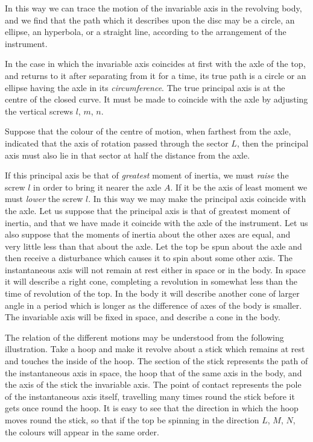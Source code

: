 \documentclass[12pt]{article}
\begin{document}
In this way we can trace the motion of the invariable axis in the
revolving body, and we find that the path which it describes upon the
disc may be a circle, an ellipse, an hyperbola, or a straight line,
according to the arrangement of the instrument.

In the case in which the invariable axis coincides at first with the
axle of the top, and returns to it after separating from it for a
time, its true path is a circle or an ellipse having the axle in its
\emph{circumference}.  The true principal axis is at the centre of the
closed curve.  It must be made to coincide with the axle by adjusting
the vertical screws $l$, $m$, $n$.

Suppose that the colour of the centre of motion, when farthest from
the axle, indicated that the axis of rotation passed through the
sector $L$, then the principal axis must also lie in that sector at
half the distance from the axle.

If this principal axis be that of \emph{greatest} moment of inertia,
we must \emph{raise} the screw $l$ in order to bring it nearer the
axle $A$.  If it be the axis of least moment we must \emph{lower} the
screw $l$.  In this way we may make the principal axis coincide with
the axle.  Let us suppose that the principal axis is that of greatest
moment of inertia, and that we have made it coincide with the axle of
the instrument.  Let us also suppose that the moments of inertia about
the other axes are equal, and very little less than that about the
axle.  Let the top be spun about the axle and then receive a
disturbance which causes it to spin about some other axis.  The
instantaneous axis will not remain at rest either in space or in the
body.  In space it will describe a right cone, completing a revolution
in somewhat less than the time of revolution of the top.  In the body
it will describe another cone of larger angle in a period which is
longer as the difference of axes of the body is smaller.  The
invariable axis will be fixed in space, and describe a cone in the
body.

The relation of the different motions may be understood from the
following illustration.  Take a hoop and make it revolve about a stick
which remains at rest and touches the inside of the hoop.  The section
of the stick represents the path of the instantaneous axis in space,
the hoop that of the same axis in the body, and the axis of the stick
the invariable axis.  The point of contact represents the pole of the
instantaneous axis itself, travelling many times round the stick
before it gets once round the hoop.  It is easy to see that the
direction in which the hoop moves round the stick, so that if the top
be spinning in the direction $L$, $M$, $N$, the colours will appear in
the same order.
\end{document}

